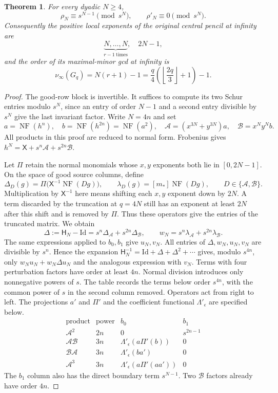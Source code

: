 \documentclass[11pt,a4paper,reqno]{amsart}
\numberwithin{equation}{section}
\theoremstyle{plain}
\newtheorem{theorem}{Theorem}[section]
\theoremstyle{definition}
\theoremstyle{remark}
\newcommand{\Id}{\mathrm{Id}}
\DeclareMathOperator{\NF}{NF}
\begin{document}
\begin{theorem}\label{thm:infinity}
For every dyadic $N\geq4$,
\[
\rho_N\equiv s^{N-1}\pmod{s^N},\qquad
\rho'_N\equiv0\pmod{s^N}.
\]
Consequently the positive local exponents of the original central pencil at infinity are
\[
\underbrace{N,\ldots,N}_{r-1\ \text{times}},\quad 2N-1,
\]
and the order of its maximal-minor gcd at infinity is
\[
\nu_\infty(G_q)=N(r+1)-1
=\frac q4\left(\left\lfloor\frac{2q}{3}\right\rfloor+1\right)-1.
\]
\end{theorem}
\begin{proof}
The good-row block is invertible. It suffices to compute its two
Schur entries modulo $s^N$, since an entry of order $N-1$ and a
second entry divisible by $s^N$ give the last invariant factor.
Write $N=4n$ and set
\[
a=\NF(h^n),\quad b=\NF(h^{2n})=\NF(a^2),\quad
\mathcal A=(x^{3N}+y^{3N})a,\quad\mathcal B=x^Ny^Nb.
\]
All products in this proof are reduced to normal form. Frobenius gives
$h^N=\mathsf X+s^n\mathcal A+s^{2n}\mathcal B$.

Let $\Pi$ retain the normal monomials whose $x,y$ exponents both lie
in $[0,2N-1]$. On the space of good source columns, define
\[
\Delta_D(g)=\Pi\bigl(\mathsf X^{-1}\NF(Dg)\bigr),\qquad
\lambda_D(g)=[m_*]\NF(Dg),\qquad D\in\{\mathcal A,\mathcal B\}.
\]
Multiplication by $\mathsf X^{-1}$ here means shifting each $x,y$
exponent down by $2N$. A term discarded by the truncation at $q=4N$
still has an exponent at least $2N$ after this shift and is removed by
$\Pi$. Thus these operators give the entries of the truncated matrix.
We obtain
\[
\Delta:=\mathsf H_N-\Id
 =s^n\Delta_{\mathcal A}+s^{2n}\Delta_{\mathcal B},\qquad
w_N=s^n\lambda_{\mathcal A}+s^{2n}\lambda_{\mathcal B}.
\]
The same expressions applied to $b_0,b_1$ give $u_N,v_N$.
All entries of $\Delta,w_N,u_N,v_N$ are divisible by $s^n$.
Hence the expansion
$\mathsf H_N^{-1}=\Id+\Delta+\Delta^2+\cdots$ gives, modulo $s^{4n}$,
only $w_Nu_N+w_N\Delta u_N$ and the analogous expression with $v_N$.
Terms with four perturbation factors have order at least $4n$.
Normal division introduces only nonnegative powers of $s$.
The table records the terms below order $s^{4n}$, with the common
power of $s$ in the second column removed. Operators act from right to
left. The projections $a'$ and $\Pi'$ and the coefficient functional
$\Lambda'_\epsilon$ are specified below.
\[
\begin{array}{c|c|c|c}
\text{product}&\text{power}& b_0 & b_1\\ \hline
\mathcal A^2&2n&0&s^{2n-1}\\
\mathcal A\mathcal B&3n&\Lambda'_\epsilon(a\Pi'(b))&0\\
\mathcal B\mathcal A&3n&\Lambda'_\epsilon(ba')&0\\
\mathcal A^3&3n&\Lambda'_\epsilon(a\Pi'(aa'))&0
\end{array}
\]
The $b_1$ column also has the direct boundary term $s^{N-1}$.
Two $\mathcal B$ factors already have order $4n$.


\end{proof}
\end{document}
